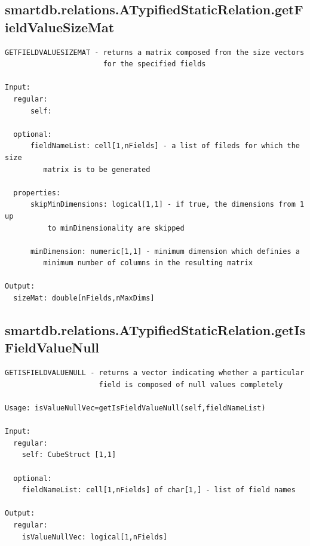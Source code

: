 \documentclass[letterpaper,10pt,english]{sphinxmanual}
\begin{document}
\subsection{smartdb.relations.ATypifiedStaticRelation.getFieldValueSizeMat}
\label{chap_functions:smartdb-relations-atypifiedstaticrelation-getfieldvaluesizemat}
\begin{Verbatim}[commandchars=\\\{\}]
GETFIELDVALUESIZEMAT - returns a matrix composed from the size vectors
                       for the specified fields

Input:
  regular:
      self:

  optional:
      fieldNameList: cell[1,nFields] - a list of fileds for which the size
         matrix is to be generated

  properties:
      skipMinDimensions: logical[1,1] - if true, the dimensions from 1 up
          to minDimensionality are skipped

      minDimension: numeric[1,1] - minimum dimension which definies a
         minimum number of columns in the resulting matrix

Output:
  sizeMat: double[nFields,nMaxDims]
\end{Verbatim}


\subsection{smartdb.relations.ATypifiedStaticRelation.getIsFieldValueNull}
\label{chap_functions:smartdb-relations-atypifiedstaticrelation-getisfieldvaluenull}
\begin{Verbatim}[commandchars=\\\{\}]
GETISFIELDVALUENULL - returns a vector indicating whether a particular
                      field is composed of null values completely

Usage: isValueNullVec=getIsFieldValueNull(self,fieldNameList)

Input:
  regular:
    self: CubeStruct [1,1]

  optional:
    fieldNameList: cell[1,nFields] of char[1,] - list of field names

Output:
  regular:
    isValueNullVec: logical[1,nFields]
\end{Verbatim}
\end{document}
